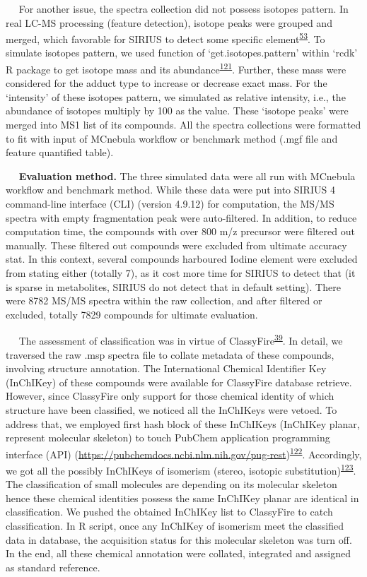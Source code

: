    For another issue, the spectra collection did not possess isotopes
pattern. In real LC-MS processing (feature detection), isotope peaks
were grouped and merged, which favorable for SIRIUS to detect some
specific element\textsuperscript{\protect\hyperlink{ref-2009}{53}}. To
simulate isotopes pattern, we used function of `get.isotopes.pattern'
within `rcdk' R package to get isotope mass and its
abundance\textsuperscript{\protect\hyperlink{ref-2007j}{121}}. Further,
these mass were considered for the adduct type to increase or decrease
exact mass. For the `intensity' of these isotopes pattern, we simulated
as relative intensity, i.e., the abundance of isotopes multiply by 100
as the value. These `isotope peaks' were merged into MS1 list of its
compounds. All the spectra collections were formatted to fit with input
of MCnebula workflow or benchmark method (.mgf file and feature
quantified table).

   \textbf{Evaluation method.} The three simulated data were all run
with MCnebula workflow and benchmark method. While these data were put
into SIRIUS 4 command-line interface (CLI) (version 4.9.12) for
computation, the MS/MS spectra with empty fragmentation peak were
auto-filtered. In addition, to reduce computation time, the compounds
with over 800 m/z precursor were filtered out manually. These filtered
out compounds were excluded from ultimate accuracy stat. In this
context, several compounds harboured Iodine element were excluded from
stating either (totally 7), as it cost more time for SIRIUS to detect
that (it is sparse in metabolites, SIRIUS do not detect that in default
setting). There were 8782 MS/MS spectra within the raw collection, and
after filtered or excluded, totally 7829 compounds for ultimate
evaluation.

   The assessment of classification was in virtue of
ClassyFire\textsuperscript{\protect\hyperlink{ref-2016}{39}}. In detail,
we traversed the raw .msp spectra file to collate metadata of these
compounds, involving structure annotation. The International Chemical
Identifier Key (InChIKey) of these compounds were available for
ClassyFire database retrieve. However, since ClassyFire only support for
those chemical identity of which structure have been classified, we
noticed all the InChIKeys were vetoed. To address that, we employed
first hash block of these InChIKeys (InChIKey planar, represent
molecular skeleton) to touch PubChem application programming interface
(API)
(\url{https://pubchemdocs.ncbi.nlm.nih.gov/pug-rest})\textsuperscript{\protect\hyperlink{ref-2022ak}{122}}.
Accordingly, we got all the possibly InChIKeys of isomerism (stereo,
isotopic
substitution)\textsuperscript{\protect\hyperlink{ref-2012e}{123}}. The
classification of small molecules are depending on its molecular
skeleton hence these chemical identities possess the same InChIKey
planar are identical in classification. We pushed the obtained InChIKey
list to ClassyFire to catch classification. In R script, once any
InChIKey of isomerism meet the classified data in database, the
acquisition status for this molecular skeleton was turn off. In the end,
all these chemical annotation were collated, integrated and assigned as
standard reference.

